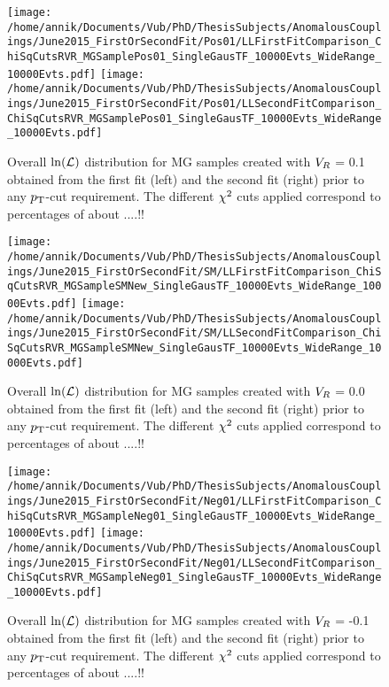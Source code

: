 \begin{figure}[h!t]
 \centering 
 \texttt{[image: /home/annik/Documents/Vub/PhD/ThesisSubjects/AnomalousCouplings/June2015\_FirstOrSecondFit/Pos01/LLFirstFitComparison\_ChiSqCutsRVR\_MGSamplePos01\_SingleGausTF\_10000Evts\_WideRange\_10000Evts.pdf]}
 \texttt{[image: /home/annik/Documents/Vub/PhD/ThesisSubjects/AnomalousCouplings/June2015\_FirstOrSecondFit/Pos01/LLSecondFitComparison\_ChiSqCutsRVR\_MGSamplePos01\_SingleGausTF\_10000Evts\_WideRange\_10000Evts.pdf]}
 \caption{Overall $\ln(\mathcal{L})$ distribution for MG samples created with $V_{R}$ = 0.1 obtained from the first fit (left) and the second fit (right) prior to any $p_{\textrm T}$-cut requirement. The different $\chi^{2}$ cuts applied correspond to percentages of about ....!!} 
 \label{fig::FirstVsSecondFitPos01}
\end{figure}
\begin{figure}[h!t]
 \centering 
 \texttt{[image: /home/annik/Documents/Vub/PhD/ThesisSubjects/AnomalousCouplings/June2015\_FirstOrSecondFit/SM/LLFirstFitComparison\_ChiSqCutsRVR\_MGSampleSMNew\_SingleGausTF\_10000Evts\_WideRange\_10000Evts.pdf]}
 \texttt{[image: /home/annik/Documents/Vub/PhD/ThesisSubjects/AnomalousCouplings/June2015\_FirstOrSecondFit/SM/LLSecondFitComparison\_ChiSqCutsRVR\_MGSampleSMNew\_SingleGausTF\_10000Evts\_WideRange\_10000Evts.pdf]}
 \caption{Overall $\ln(\mathcal{L})$ distribution for MG samples created with $V_{R}$ = 0.0 obtained from the first fit (left) and the second fit (right) prior to any $p_{\textrm T}$-cut requirement. The different $\chi^{2}$ cuts applied correspond to percentages of about ....!!} 
 \label{fig::FirstVsSecondFitSM}
\end{figure}
\begin{figure}[h!t]
 \centering 
 \texttt{[image: /home/annik/Documents/Vub/PhD/ThesisSubjects/AnomalousCouplings/June2015\_FirstOrSecondFit/Neg01/LLFirstFitComparison\_ChiSqCutsRVR\_MGSampleNeg01\_SingleGausTF\_10000Evts\_WideRange\_10000Evts.pdf]}
 \texttt{[image: /home/annik/Documents/Vub/PhD/ThesisSubjects/AnomalousCouplings/June2015\_FirstOrSecondFit/Neg01/LLSecondFitComparison\_ChiSqCutsRVR\_MGSampleNeg01\_SingleGausTF\_10000Evts\_WideRange\_10000Evts.pdf]}
 \caption{Overall $\ln(\mathcal{L})$ distribution for MG samples created with $V_{R}$ = -0.1 obtained from the first fit (left) and the second fit (right) prior to any $p_{\textrm T}$-cut requirement. The different $\chi^{2}$ cuts applied correspond to percentages of about ....!!} 
 \label{fig::FirstVsSecondFitNeg01}
\end{figure}
